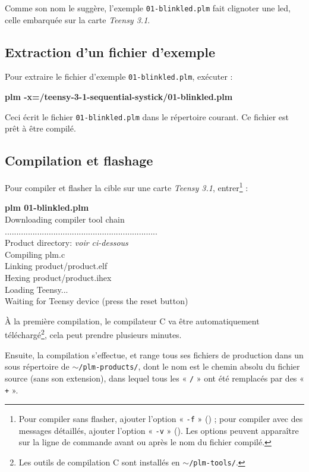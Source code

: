 Comme son nom le suggère, l'exemple \texttt{01-blinkled.plm} fait clignoter une led, celle embarquée sur la carte \emph{Teensy 3.1}.

\subsection{Extraction d'un fichier d'exemple}

Pour extraire le fichier d'exemple \texttt{01-blinkled.plm}, exécuter :

\begin{SHELL}
\bfseries plm -x=/teensy-3-1-sequential-systick/01-blinkled.plm
\end{SHELL}


Ceci écrit le fichier \texttt{01-blinkled.plm} dans le répertoire courant. Ce fichier est prêt à être compilé.

\subsection{Compilation et flashage}

Pour compiler et flasher la cible sur une carte \emph{Teensy 3.1}, entrer\footnote{Pour compiler sans flasher, ajouter l'option « \texttt{-f} » () ; pour compiler avec des messages détaillés, ajouter l'option « \texttt{-v} » (). Les options peuvent apparaître sur la ligne de commande avant ou après le nom du fichier compilé.} :
\begin{SHELL}
{\bfseries plm 01-blinkled.plm}\\
Downloading compiler tool chain\\
..................................................................\\
Product directory: \emph{voir ci-dessous}\\
Compiling plm.c\\
Linking product/product.elf\\
Hexing product/product.ihex\\
Loading Teensy...\\
Waiting for Teensy device (press the reset button)
\end{SHELL}

À la première compilation, le compilateur C va être automatiquement téléchargé\footnote{Les outils de compilation C sont installés en \texttt{$\sim$/plm-tools/}.}, cela peut prendre plusieurs minutes.

Ensuite, la compilation s'effectue, et range tous ses fichiers de production dans un sous répertoire de \texttt{$\sim$/plm-products/}, dont le nom est le  chemin absolu du fichier source (sans son extension), dans lequel tous les « \texttt{/} » ont été remplacés par des « \texttt{+} ».

